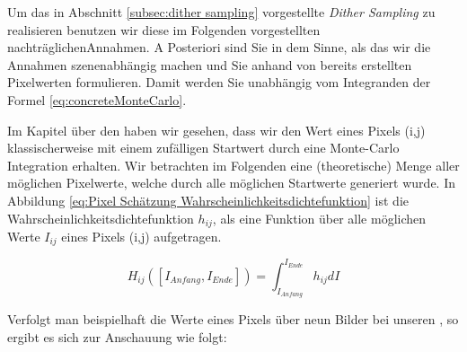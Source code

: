 Um das in Abschnitt \ref{subsec:dither sampling} vorgestellte \textit{Dither Sampling} zu realisieren
benutzen wir diese im Folgenden vorgestellten \glqq nachträglichen\grqq Annahmen. 
A Posteriori sind Sie in dem Sinne, als das wir die Annahmen szenenabhängig machen und Sie anhand 
von bereits erstellten Pixelwerten formulieren. Damit werden Sie unabhängig vom Integranden der Formel 
\ref{eq:concreteMonteCarlo}.

\par

Im Kapitel über den  haben wir gesehen, dass 
wir den Wert eines Pixels (i,j) klassischerweise mit einem zufälligen
Startwert durch eine Monte-Carlo Integration erhalten. Wir betrachten im
Folgenden eine (theoretische) Menge aller möglichen Pixelwerte, welche durch alle möglichen Startwerte generiert wurde.
In Abbildung \ref{eq:Pixel Schätzung Wahrscheinlichkeitsdichtefunktion} ist die Wahrscheinlichkeitsdichtefunktion
$h_{ij}$, als eine Funktion über alle möglichen Werte $I_{ij}$ eines Pixels (i,j) aufgetragen.

\begin{tcolorbox}[rightrule=3mm, rounded corners=east]
    \begin{equation}\label{eq:Pixel Schätzung Wahrscheinlichkeitsdichtefunktion}
        H_{ij}([I_{Anfang},I_{Ende}]) = \int_{I_{Anfang}}^{I_{Ende}} h_{ij} dI
    \end{equation}
\end{tcolorbox}

Verfolgt man beispielhaft die Werte eines Pixels über neun Bilder bei unseren , 
so ergibt es sich zur Anschauung wie folgt:

